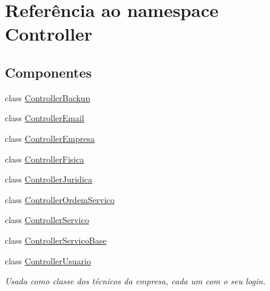 \hypertarget{namespace_controller}{}\section{Referência ao namespace Controller}
\label{namespace_controller}
\subsection*{Componentes}
\begin{DoxyCompactItemize}
\item 
class \hyperlink{class_controller_1_1_controller_backup}{Controller\+Backup}
\item 
class \hyperlink{class_controller_1_1_controller_email}{Controller\+Email}
\item 
class \hyperlink{class_controller_1_1_controller_empresa}{Controller\+Empresa}
\item 
class \hyperlink{class_controller_1_1_controller_fisica}{Controller\+Fisica}
\item 
class \hyperlink{class_controller_1_1_controller_juridica}{Controller\+Juridica}
\item 
class \hyperlink{class_controller_1_1_controller_ordem_servico}{Controller\+Ordem\+Servico}
\item 
class \hyperlink{class_controller_1_1_controller_servico}{Controller\+Servico}
\item 
class \hyperlink{class_controller_1_1_controller_servico_base}{Controller\+Servico\+Base}
\item 
class \hyperlink{class_controller_1_1_controller_usuario}{Controller\+Usuario}
\begin{DoxyCompactList}\small\item\em Usada como classe dos técnicos da empresa, cada um com o seu login. \end{DoxyCompactList}\end{DoxyCompactItemize}
